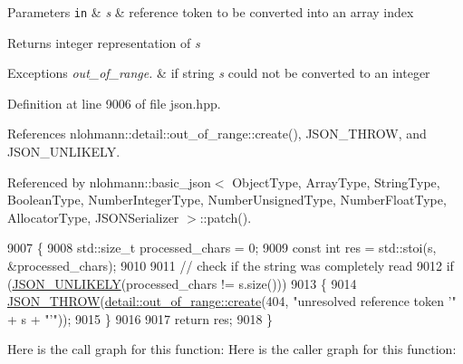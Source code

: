 \begin{DoxyParams}[1]{Parameters}
\mbox{\tt in}  & {\em s} & reference token to be converted into an array index\\
\hline
\end{DoxyParams}
\begin{DoxyReturn}{Returns}
integer representation of {\itshape s} 
\end{DoxyReturn}

\begin{DoxyExceptions}{Exceptions}
{\em out\+\_\+of\+\_\+range.} & if string {\itshape s} could not be converted to an integer \\
\hline
\end{DoxyExceptions}


Definition at line 9006 of file json.\+hpp.



References nlohmann\+::detail\+::out\+\_\+of\+\_\+range\+::create(), J\+S\+O\+N\+\_\+\+T\+H\+R\+OW, and J\+S\+O\+N\+\_\+\+U\+N\+L\+I\+K\+E\+LY.



Referenced by nlohmann\+::basic\+\_\+json$<$ Object\+Type, Array\+Type, String\+Type, Boolean\+Type, Number\+Integer\+Type, Number\+Unsigned\+Type, Number\+Float\+Type, Allocator\+Type, J\+S\+O\+N\+Serializer $>$\+::patch().


\begin{DoxyCode}
9007     \{
9008         std::size\_t processed\_chars = 0;
9009         \textcolor{keyword}{const} \textcolor{keywordtype}{int} res = std::stoi(s, &processed\_chars);
9010 
9011         \textcolor{comment}{// check if the string was completely read}
9012         \textcolor{keywordflow}{if} (\hyperlink{json_8hpp_ab77582407c64944e7db1ea95ab520253}{JSON\_UNLIKELY}(processed\_chars != s.size()))
9013         \{
9014             \hyperlink{json_8hpp_a6c274f6db2e65c1b66c7d41b06ad690f}{JSON\_THROW}(\hyperlink{classnlohmann_1_1detail_1_1out__of__range_a3f6d82a6f967c4728a1ec735a7867073}{detail::out\_of\_range::create}(404, \textcolor{stringliteral}{"unresolved
       reference token '"} + s + \textcolor{stringliteral}{"'"}));
9015         \}
9016 
9017         \textcolor{keywordflow}{return} res;
9018     \}
\end{DoxyCode}
Here is the call graph for this function\+:
Here is the caller graph for this function\+:
\mbox{\label{classnlohmann_1_1json__pointer_a8abf3577f9a0087f29a233893cdc73ad}} 
